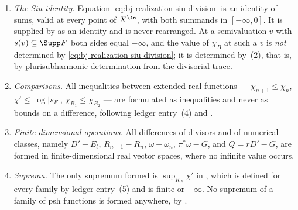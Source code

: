 \begin{proposition}
\begin{enumerate}
 infinite quantities that the proof appears to perform is the passage from
 \eqref{eq:bj-realization-siu-division} to
 $\chi_B(v)=\chi'(v)-\log|s_F|(v)$.  It is performed exclusively for
 $v\in X^{\divis}$, where $\log|s_F|(v)=-v(F)$ is a finite real
 number, so that the operation is the subtraction of a finite constant,
 legitimate by ledger entry~(2).
\item\label{itm:ch38-safe:siu}
 \emph{The Siu identity.}  Equation
 \eqref{eq:bj-realization-siu-division} is an identity of sums, valid at
 every point of $X^{\An}$, with both summands in $[-\infty,0]$.  It is
 supplied by  as an identity and is
 never rearranged.  At a semivaluation $v$ with
 $s(v)\subseteq\Supp F$ both sides equal $-\infty$, and the value of
 $\chi_B$ at such a $v$ is \emph{not} determined by
 \eqref{eq:bj-realization-siu-division}; it is determined by
 \,(2), that is, by
 plurisubharmonic determination from the divisorial trace.
\item\label{itm:ch38-safe:comparison}
 \emph{Comparisons.}  All inequalities between extended-real functions
 --- $\chi_{n+1}\leq\chi_n$, $\chi'\leq\log|s_F|$,
 $\chi_{B_1}\leq\chi_{B_2}$ --- are formulated as inequalities and never
 as bounds on a difference, following ledger entry~(4) and
 .
\item\label{itm:ch38-safe:finite}
 \emph{Finite-dimensional operations.}  All differences of divisors and of
 numerical classes, namely $D'-E_t$, $R_{n+1}-R_n$,
 $\omega-\omega_n$, $\pi^*\omega-G$, and $Q=rD'-G$, are formed in
 finite-dimensional real vector spaces, where no infinite value occurs.
\item\label{itm:ch38-safe:sup}
 \emph{Suprema.}  The only supremum formed is
 $\sup_{K_F}\chi'$ in , which is defined for
 every family by ledger entry~(5) and is finite or $-\infty$.  No
 supremum of a family of psh functions is formed anywhere, by
 .
\end{enumerate}
\end{proposition}

